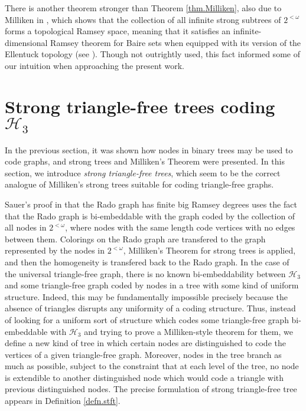 \documentclass{amsart}
\theoremstyle{remark}
\theoremstyle{definition}
\theoremstyle{remark}
\newcommand{\om}{\omega}
\begin{document}
There is another theorem  stronger than Theorem \ref{thm.Milliken},  also due to Milliken in \cite{Milliken81},
which shows that the collection of all infinite strong subtrees of $2^{<\om}$ forms a topological Ramsey space, meaning that it satisfies an infinite-dimensional Ramsey theorem for Baire sets when equipped with its version of the  Ellentuck  topology (see \cite{TodorcevicBK10}).
Though not outrightly used, this  fact informed some of our intuition when  approaching  the present work.








\section{Strong triangle-free trees coding $\mathcal{H}_3$}\label{sec.3}


In the previous section, it was shown how nodes in binary trees may be used to code graphs, and strong trees and Milliken's Theorem were presented.
In this section, we introduce {\em strong triangle-free trees}, which
 seem to be the correct analogue of  Milliken's  strong trees suitable for  coding triangle-free graphs.



Sauer's  proof in \cite{Sauer06} that the Rado graph has finite big Ramsey degrees
uses the fact that the Rado graph is bi-embeddable with the graph coded by the collection of  all nodes in $2^{<\om}$, where  nodes with the same length code vertices with no edges between them.
Colorings on the Rado graph are transfered to the graph represented by  the nodes in $2^{<\om}$,  Milliken's Theorem for strong trees is applied, and then the homogeneity is transfered back to the Rado graph.
In the case of the universal triangle-free graph, there is no known   bi-embeddability between $\mathcal{H}_3$ and some triangle-free graph coded by nodes in a tree with some kind of uniform structure.
Indeed, this may be fundamentally impossible  precisely because the absence of  triangles disrupts any uniformity of a coding structure.
Thus, instead of looking for a uniform sort of  structure
which codes some triangle-free graph bi-embeddable with $\mathcal{H}_3$
and trying to prove a Milliken-style theorem for them,
 we define a new kind of tree in which certain nodes are distinguished to
code the vertices of a given triangle-free graph.
Moreover,
 nodes in the tree
   branch as much as possible, subject to the constraint that at each level of the tree, no  node
is
extendible to another distinguished node  which  would code a triangle with previous distinguished  nodes.
 The precise formulation of  strong triangle-free tree appears in  Definition \ref{defn.stft}.
\end{document}

